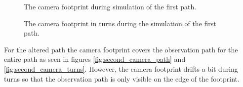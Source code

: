 \begin{figure}[]
    \centering
    \caption{The camera footprint during simulation of the first path.}
	\label{fig:first_camera_path}
\end{figure}

\begin{figure}[]
    \centering
    \caption{The camera footprint in turns during the simulation of the first path.}
	\label{fig:first_camera_turns}
\end{figure}

For the altered path the camera footprint covers the observation path for the entire path as seen in figures \ref{fig:second_camera_path} and \ref{fig:second_camera_turns}. However, the camera footprint drifts a bit during turns so that the observation path is only visible on the edge of the footprint.

